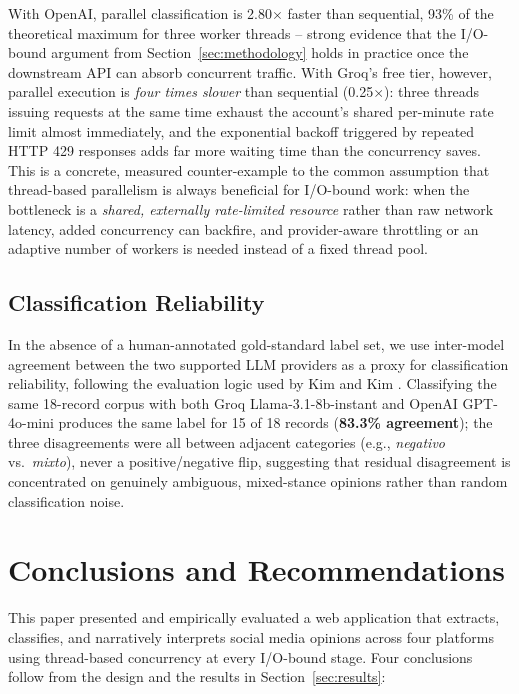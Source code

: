 \documentclass[runningheads]{llncs}
\begin{document}
With OpenAI, parallel classification is 2.80$\times$ faster than sequential,
93\% of the theoretical maximum for three worker threads -- strong evidence
that the I/O-bound argument from Section~\ref{sec:methodology} holds in
practice once the downstream API can absorb concurrent traffic. With Groq's
free tier, however, parallel execution is \emph{four times slower} than
sequential (0.25$\times$): three threads issuing requests at the same time
exhaust the account's shared per-minute rate limit almost immediately, and
the exponential backoff triggered by repeated HTTP 429 responses adds far
more waiting time than the concurrency saves. This is a concrete, measured
counter-example to the common assumption that thread-based parallelism is
always beneficial for I/O-bound work: when the bottleneck is a
\emph{shared, externally rate-limited resource} rather than raw network
latency, added concurrency can backfire, and provider-aware
throttling or an adaptive number of workers is needed instead of a
fixed thread pool.

\subsection{Classification Reliability}

In the absence of a human-annotated gold-standard label set, we use
inter-model agreement between the two supported LLM providers as a proxy
for classification reliability, following the evaluation logic used by Kim
and Kim \cite{kim2025llm}. Classifying the same 18-record corpus with both
Groq Llama-3.1-8b-instant and OpenAI GPT-4o-mini produces the same label for
15 of 18 records (\textbf{83.3\% agreement}); the three disagreements were
all between adjacent categories (e.g., \emph{negativo} vs.\ \emph{mixto}),
never a positive/negative flip, suggesting that residual disagreement is
concentrated on genuinely ambiguous, mixed-stance opinions rather than
random classification noise.

\section{Conclusions and Recommendations}
\label{sec:conclusions}

This paper presented and empirically evaluated a web application that
extracts, classifies, and narratively interprets social media opinions
across four platforms using thread-based concurrency at every I/O-bound
stage. Four conclusions follow from the design and the results in
Section~\ref{sec:results}:
\end{document}

